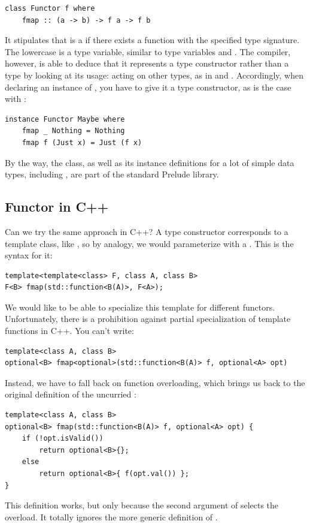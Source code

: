 \begin{verbatim}
class Functor f where
    fmap :: (a -> b) -> f a -> f b
\end{verbatim}
It stipulates that  is a  if there exists a
function  with the specified type signature. The lowercase
 is a type variable, similar to type variables  and
. The compiler, however, is able to deduce that it represents
a type constructor rather than a type by looking at its usage: acting on
other types, as in  and . Accordingly, when
declaring an instance of , you have to give it a type
constructor, as is the case with :

\begin{verbatim}
instance Functor Maybe where
    fmap _ Nothing = Nothing
    fmap f (Just x) = Just (f x)
\end{verbatim}
By the way, the  class, as well as its instance
definitions for a lot of simple data types, including ,
are part of the standard Prelude library.

\subsection{Functor in C++}\label{functor-in-c}

Can we try the same approach in C++? A type constructor corresponds to a
template class, like , so by analogy, we would
parameterize  with a 
. This is the syntax for it:

\begin{verbatim}
template<template<class> F, class A, class B>
F<B> fmap(std::function<B(A)>, F<A>);
\end{verbatim}
We would like to be able to specialize this template for different
functors. Unfortunately, there is a prohibition against partial
specialization of template functions in C++. You can't write:

\begin{verbatim}
template<class A, class B>
optional<B> fmap<optional>(std::function<B(A)> f, optional<A> opt)
\end{verbatim}
Instead, we have to fall back on function overloading, which brings us
back to the original definition of the uncurried :

\begin{verbatim}
template<class A, class B>
optional<B> fmap(std::function<B(A)> f, optional<A> opt) { 
    if (!opt.isValid()) 
        return optional<B>{}; 
    else
        return optional<B>{ f(opt.val()) };
}
\end{verbatim}
This definition works, but only because the second argument of
 selects the overload. It totally ignores the more generic
definition of .

